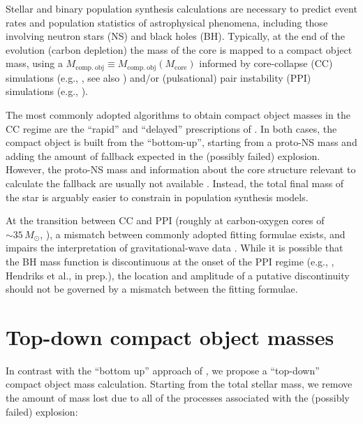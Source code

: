 \documentclass[twocolumn]{aastex63}
\begin{document}
Stellar and binary population synthesis calculations are necessary to
predict event rates and population statistics of astrophysical
phenomena, including those involving neutron stars (NS) and
black holes (BH). Typically, at the end of the evolution (carbon
depletion) the mass of the core is mapped to a compact object mass, using a
$M_\mathrm{comp.\ obj}\equiv M_\mathrm{comp.\ obj}(M_\mathrm{core})$
informed by core-collapse (CC) simulations (e.g., \citealt{fryer:12,
  spera:15, mandel:20, couch:20}, see also \citealt{zapartas:21,
  patton:21}) and/or (pulsational) pair instability (PPI) simulations
(e.g., \citealt{belczynski:16, woosley:17, spera:17, stevenson:19,
  marchant:19, farmer:19, breivik:20, renzo:20csm, costa:21}).

The most commonly adopted algorithms to obtain compact object masses
in the CC regime are the ``rapid'' and ``delayed'' prescriptions of
\cite{fryer:12}. In both cases, the compact object is built from the
``bottom-up'', starting from a proto-NS mass and adding the amount of
fallback expected in the (possibly failed) explosion. However, the
proto-NS mass and information about the core structure relevant to
calculate the fallback are usually not available
\citep[e.g.,][]{patton:20}. Instead, the total final mass of the star
is arguably easier to constrain in population synthesis models.

At the transition between CC and PPI (roughly at carbon-oxygen cores
of $\sim{}35\,M_\odot$, \citealt{woosley:17, marchant:19, farmer:19,
  renzo:20csm, costa:21}), a mismatch between commonly adopted fitting
formulae exists, and impairs the
interpretation of gravitational-wave data \citep[as pointed out in
Fig.~5 of][]{vanson:21}. While it is possible that the BH mass
function is discontinuous at the onset of the PPI regime (e.g.,
\citealt{renzo:20conv,costa:21}, Hendriks et al., in prep.), the
location and amplitude of a putative discontinuity should not be
governed by a mismatch between the fitting formulae.


\section{Top-down compact object masses}

In contrast with the ``bottom up'' approach of \cite{fryer:12}, we
propose a ``top-down'' compact object mass calculation. Starting from
the total stellar mass, we remove the amount of mass lost due to all
of the processes associated with the (possibly failed) explosion:
\end{document}
